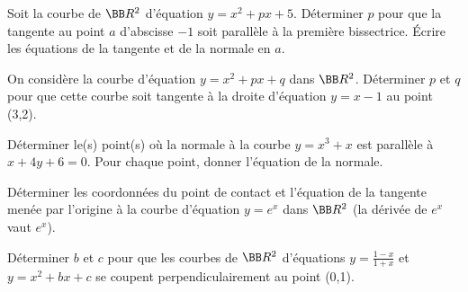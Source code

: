 \documentclass[12pt,french,oneside,a4paper]{memoir} %
\begin{document}
\begin{exo}
Soit la courbe de $\BB R^2$ d'équation $y=x^2+px+5$.
 Déterminer $p$ pour que la tangente au point $a$ d'abscisse $-1$
 soit parallèle à la première bissectrice. Écrire les
 équations de la tangente et de la normale en $a$.
\end{exo}
\begin{exo}
On considère la courbe d'équation $y=x^2+px+q$ dans
 $\BB R^2$. Déterminer $p$ et $q$ pour que cette courbe soit tangente
 à la droite d'équation $y=x-1$ au point (3,2).
\end{exo}
\begin{exo}
Déterminer le(s) point(s) où la normale à la courbe
 $y=x^3+x$ est parallèle à $x+4y+6=0$. Pour chaque point, donner
 l'équation de la normale.
\end{exo}

\begin{exo}
Déterminer les coordonnées du point de contact et
 l'équation de la tangente menée par l'origine à la courbe
 d'équation $y=e^x$ dans $\BB R^2$ (la dérivée de $e^x$ vaut
 $e^x$).
\end{exo}
\begin{exo}
Déterminer $b$ et $c$ pour que les courbes de $\BB R^2$
 d'équations $y=\displaystyle{\frac{1-x}{1+x}}$ et $y=x^2+bx+c$ se
 coupent perpendiculairement au point (0,1).
\end{exo}
\end{document}
